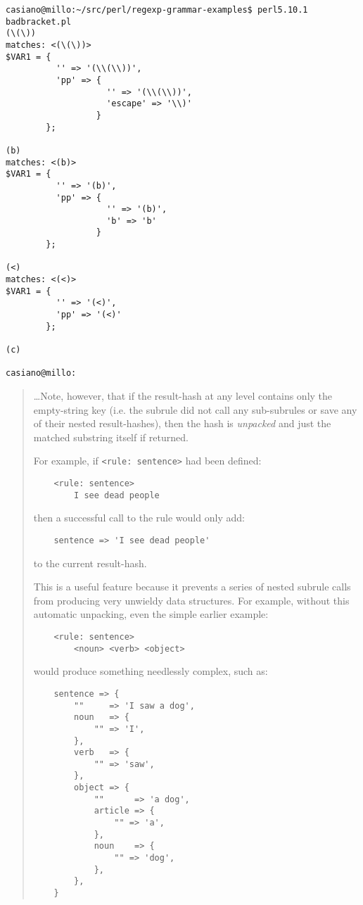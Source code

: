 \begin{verbatim}
casiano@millo:~/src/perl/regexp-grammar-examples$ perl5.10.1 badbracket.pl
(\(\))
matches: <(\(\))>
$VAR1 = {
          '' => '(\\(\\))',
          'pp' => {
                    '' => '(\\(\\))',
                    'escape' => '\\)'
                  }
        };

(b)
matches: <(b)>
$VAR1 = {
          '' => '(b)',
          'pp' => {
                    '' => '(b)',
                    'b' => 'b'
                  }
        };

(<)
matches: <(<)>
$VAR1 = {
          '' => '(<)',
          'pp' => '(<)'
        };

(c)

casiano@millo:
\end{verbatim}


\begin{it}\begin{quotation}
\ldots Note, however, that if the result-hash at any level contains only the
empty-string key (i.e. the subrule did not call any sub-subrules or
save any of their nested result-hashes), then the hash is {\it unpacked}
and just the matched substring itself if returned.

For example, if \verb|<rule: sentence>| had been defined:

\begin{verbatim}
    <rule: sentence>
        I see dead people
\end{verbatim}

then a successful call to the rule would only add:

\begin{verbatim}
    sentence => 'I see dead people'
\end{verbatim}

to the current result-hash.

This is a useful feature because it prevents a series of nested subrule
calls from producing very unwieldy data structures. For example, without
this automatic unpacking, even the simple earlier example:

\begin{verbatim}
    <rule: sentence>
        <noun> <verb> <object>
\end{verbatim}

would produce something needlessly complex, such as:

\begin{verbatim}
    sentence => {
        ""     => 'I saw a dog',
        noun   => {
            "" => 'I',
        },
        verb   => {
            "" => 'saw',
        },
        object => {
            ""      => 'a dog',
            article => {
                "" => 'a',
            },
            noun    => {
                "" => 'dog',
            },
        },
    }
\end{verbatim}
\end{quotation}\end{it}

